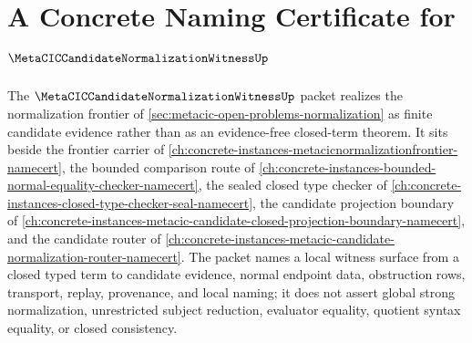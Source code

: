 \chapter{A Concrete Naming Certificate for $\MetaCICCandidateNormalizationWitnessUp$}
\label{ch:concrete-instances-metacic-candidate-normalization-witness-namecert}

The $\MetaCICCandidateNormalizationWitnessUp$ packet realizes the normalization frontier of \autoref{sec:metacic-open-problems-normalization} as finite candidate evidence rather than as an evidence-free closed-term theorem. It sits beside the frontier carrier of \autoref{ch:concrete-instances-metacicnormalizationfrontier-namecert}, the bounded comparison route of \autoref{ch:concrete-instances-bounded-normal-equality-checker-namecert}, the sealed closed type checker of \autoref{ch:concrete-instances-closed-type-checker-seal-namecert}, the candidate projection boundary of \autoref{ch:concrete-instances-metacic-candidate-closed-projection-boundary-namecert}, and the candidate router of \autoref{ch:concrete-instances-metacic-candidate-normalization-router-namecert}. The packet names a local witness surface from a closed typed term to candidate evidence, normal endpoint data, obstruction rows, transport, replay, provenance, and local naming; it does not assert global strong normalization, unrestricted subject reduction, evaluator equality, quotient syntax equality, or closed consistency.

